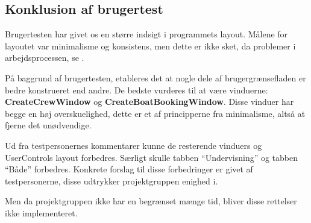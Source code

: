\subsection{Konklusion af brugertest}
Brugertesten har givet os en større indsigt i programmets layout.
Målene for layoutet var minimalisme og konsistens, men dette er ikke sket, da problemer i arbejdsprocessen, se .

På baggrund af brugertesten, etableres det at nogle dele af brugergrænsefladen er bedre konstrueret end andre.
De bedste vurderes til at være vinduerne: \textbf{CreateCrewWindow} og \textbf{CreateBoatBookingWindow}. 
Disse vinduer har begge en høj overskuelighed, dette er et af principperne fra minimalisme, altså at fjerne det unødvendige. 

Ud fra testpersonernes kommentarer kunne de resterende vinduers og UserControls layout forbedres. 
Særligt skulle tabben ``Undervisning'' og tabben ``Både'' forbedres.
Konkrete forslag til disse forbedringer er givet af testpersonerne, disse udtrykker projektgruppen enighed i. 

Men da projektgruppen ikke har en begrænset mænge tid, bliver disse rettelser ikke implementeret. 
